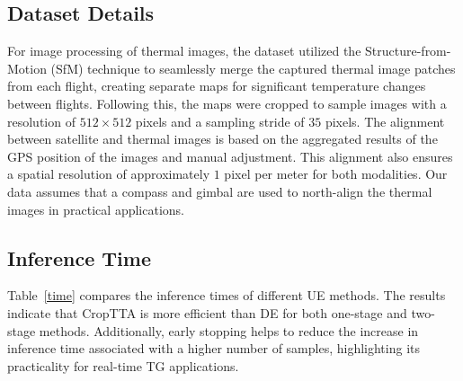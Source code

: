 \subsection{Dataset Details}\label{data}
For image processing of thermal images, the dataset utilized the Structure-from-Motion (SfM) technique to seamlessly merge the captured thermal image patches from each flight, creating separate maps for significant temperature changes between flights. Following this, the maps were cropped to sample images with a resolution of $512\times512$ pixels and a sampling stride of $35$ pixels. The alignment between satellite and thermal images is based on the aggregated results of the GPS position of the images and manual adjustment. This alignment also ensures a spatial resolution of approximately $1$ pixel per meter for both modalities. Our data assumes that a compass and gimbal are used to north-align the thermal images in practical applications.

\subsection{Inference Time}\label{inference} Table~\ref{time} compares the inference times of different UE methods. The results indicate that CropTTA is more efficient than DE for both one-stage and two-stage methods. Additionally, early stopping helps to reduce the increase in inference time associated with a higher number of samples, highlighting its practicality for real-time TG applications.

\begin{table}
    \centering
    \caption{Comparison of inference time (\si{ms}) for different UE methods with or without early stopping. We evaluate with 5 samples and in an NVIDIA RTX 2080Ti GPU.}
    \vspace{-10pt}
    \label{time}
\end{table}

